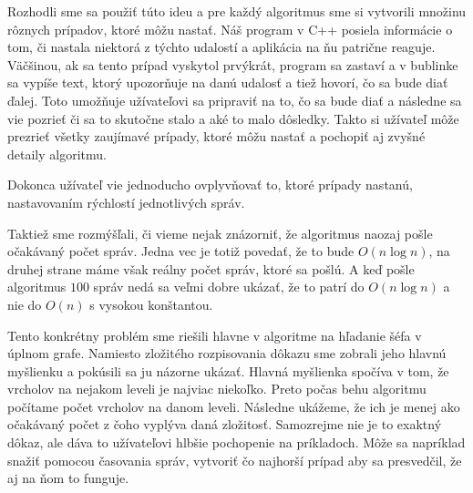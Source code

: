 Rozhodli sme sa použiť túto ideu a pre každý algoritmus sme si vytvorili množinu rôznych prípadov,
ktoré môžu nastať. Náš program v C++ posiela informácie o tom, či nastala niektorá z týchto udalostí
a aplikácia na ňu patrične reaguje. Väčšinou, ak sa tento prípad vyskytol prvýkrát, program sa
zastaví a v bublinke sa vypíše text, ktorý upozorňuje na danú udalosť a tiež hovorí, čo sa bude
diať ďalej. Toto umožňuje užívateľovi sa pripraviť na to, čo sa bude diať a následne sa vie pozrieť
či sa to skutočne stalo a aké to malo dôsledky. Takto si užívateľ môže prezrieť všetky zaujímavé
prípady, ktoré môžu nastať a pochopiť aj zvyšné detaily algoritmu.

Dokonca užívateľ vie jednoducho ovplyvňovať to, ktoré prípady nastanú, nastavovaním rýchlostí
jednotlivých správ.

Taktiež sme rozmýšľali, či vieme nejak znázorniť, že algoritmus naozaj pošle očakávaný počet správ.
Jedna vec je totiž povedať, že to bude $O(n\log n)$, na druhej strane máme však reálny počet správ,
ktoré sa pošlú. A keď pošle algoritmus $100$ správ nedá sa veľmi dobre ukázať, že to patrí do $O(n
\log n)$ a nie do $O(n)$ s vysokou konštantou.

Tento konkrétny problém sme riešili hlavne v algoritme na hľadanie šéfa v úplnom grafe. Namiesto
zložitého rozpisovania dôkazu sme zobrali jeho hlavnú myšlienku a pokúsili sa ju názorne ukázať.
Hlavná myšlienka spočíva v tom, že vrcholov na nejakom leveli je najviac niekoľko. Preto počas behu
algoritmu počítame počet vrcholov na danom leveli. Následne ukážeme, že ich je menej ako očakávaný
počet z čoho vyplýva daná zložitosť. Samozrejme nie je to exaktný dôkaz, ale dáva to užívateľovi
hlbšie pochopenie na príkladoch. Môže sa napríklad snažiť pomocou časovania správ, vytvoriť čo najhorší prípad aby sa
presvedčil, že aj na ňom to funguje.
